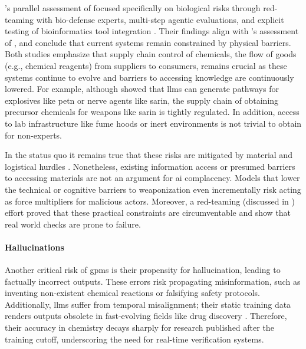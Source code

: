 's parallel assessment of  focused specifically on biological risks through red-teaming with bio-defense experts, multi-step agentic evaluations, and explicit testing of bioinformatics tool integration \autocite{anthropic2025system}. 
Their findings align with 's assessment of , and conclude that current systems remain constrained by physical barriers. Both studies emphasize that supply chain control of chemicals, the flow of goods (e.g., chemical reagents) from suppliers to consumers, remains crucial as these systems continue to evolve and barriers to accessing knowledge are continuously lowered. For example, although \textcite{he2023control} showed that \glspl{llm} can generate pathways for explosives like \gls{petn} or nerve agents like sarin, the supply chain of obtaining precursor chemicals for weapons like sarin is tightly regulated. 
In addition, access to lab infrastructure like fume hoods or inert environments is not trivial to obtain for non-experts.

In the status quo it remains true that these risks are mitigated by material and logistical hurdles \autocite{sandbrink2023artificial}. Nonetheless, existing information access or presumed barriers to accessing materials are not an argument for \gls{ai} complacency. 
Models that lower the technical or cognitive barriers to weaponization even incrementally risk acting as force multipliers for malicious actors. 
Moreover, a red-teaming (discussed in ) effort proved that these practical constraints are circumventable and show that real world checks are prone to failure.

\paragraph{Hallucinations} Another critical risk of \glspl{gpm} is their propensity for hallucination, leading to factually incorrect outputs.\autocite{pantha2024challenges, ji2023survey}
These errors risk propagating misinformation, such as inventing non-existent chemical reactions or falsifying safety protocols. 
Additionally, \glspl{llm} suffer from temporal misalignment; their static training data renders outputs obsolete in fast-evolving fields like drug discovery \autocite{pantha2024challenges}. Therefore, their accuracy in chemistry decays sharply for research published after the training cutoff, underscoring the need for real-time verification systems.

